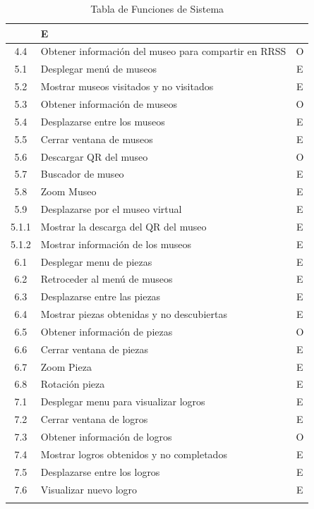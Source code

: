 \begin{longtable}{|c|p{10cm}|c|}
 & E \\ 
\hline 
4.4 & Obtener información del museo para compartir en RRSS & O \\ 
\hline 
5.1 & Desplegar menú de museos & E \\ 
\hline 
5.2 & Mostrar museos visitados y no visitados & E \\ 
\hline 
5.3 & Obtener información de museos & O \\ 
\hline 
5.4 & Desplazarse entre los museos & E \\ 
\hline 
5.5 & Cerrar ventana de museos & E \\ 
\hline 
5.6 & Descargar QR del museo & O \\ 
\hline 
5.7 & Buscador de museo & E \\ 
\hline 
5.8 & Zoom Museo & E \\ 
\hline 
5.9 & Desplazarse por el museo virtual & E \\ 
\hline 
5.1.1 & Mostrar la descarga del QR del museo & E \\ 
\hline 
5.1.2 & Mostrar información de los museos & E \\ 
\hline 
6.1 & Desplegar menu de piezas & E \\ 
\hline 
6.2 & Retroceder al menú de museos & E \\ 
\hline 
6.3 & Desplazarse entre las piezas & E \\ 
\hline 
6.4 & Mostrar piezas obtenidas y no descubiertas & E \\ 
\hline 
6.5 & Obtener información de piezas & O \\ 
\hline 
6.6 & Cerrar ventana de piezas & E \\ 
\hline 
6.7 & Zoom Pieza & E \\ 
\hline 
6.8 & Rotación pieza & E \\ 
\hline 
7.1 & Desplegar menu para visualizar logros & E \\ 
\hline 
7.2 & Cerrar ventana de logros & E \\ 
\hline 
7.3 & Obtener información de logros & O \\ 
\hline 
7.4 & Mostrar logros obtenidos y no completados & E \\ 
\hline 
7.5 & Desplazarse entre los logros & E \\ 
\hline 
7.6 & Visualizar nuevo logro & E  \\ 
\hline 
\caption{Tabla de Funciones de Sistema}
\label{tab18}\\
\end{longtable}


